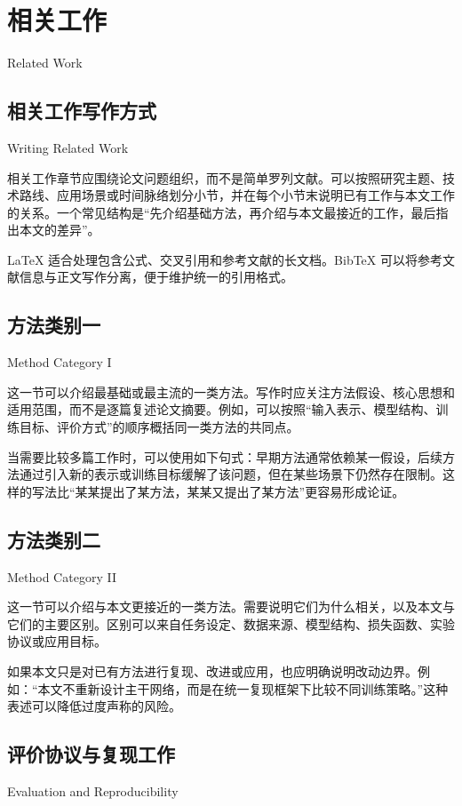 \chapter{相关工作}{Related Work}

\section{相关工作写作方式}{Writing Related Work}

相关工作章节应围绕论文问题组织，而不是简单罗列文献。可以按照研究主题、技术路线、应用场景或时间脉络划分小节，并在每个小节末说明已有工作与本文工作的关系。一个常见结构是“先介绍基础方法，再介绍与本文最接近的工作，最后指出本文的差异”。

\LaTeX{} 适合处理包含公式、交叉引用和参考文献的长文档\cite{lamport1994latex}。BibTeX 可以将参考文献信息与正文写作分离，便于维护统一的引用格式\cite{patashnik1988bibtexing}。

\section{方法类别一}{Method Category I}

这一节可以介绍最基础或最主流的一类方法。写作时应关注方法假设、核心思想和适用范围，而不是逐篇复述论文摘要。例如，可以按照“输入表示、模型结构、训练目标、评价方式”的顺序概括同一类方法的共同点。

当需要比较多篇工作时，可以使用如下句式：早期方法通常依赖某一假设，后续方法通过引入新的表示或训练目标缓解了该问题，但在某些场景下仍然存在限制。这样的写法比“某某提出了某方法，某某又提出了某方法”更容易形成论证。

\section{方法类别二}{Method Category II}

这一节可以介绍与本文更接近的一类方法。需要说明它们为什么相关，以及本文与它们的主要区别。区别可以来自任务设定、数据来源、模型结构、损失函数、实验协议或应用目标。

如果本文只是对已有方法进行复现、改进或应用，也应明确说明改动边界。例如：“本文不重新设计主干网络，而是在统一复现框架下比较不同训练策略。”这种表述可以降低过度声称的风险。

\section{评价协议与复现工作}{Evaluation and Reproducibility}

